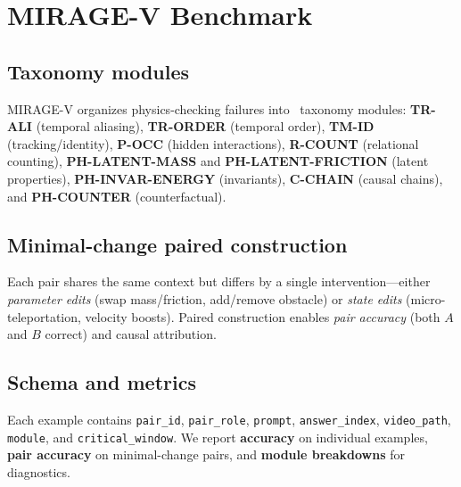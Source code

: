 \section{MIRAGE-V Benchmark}
\subsection{Taxonomy modules}
MIRAGE-V organizes physics-checking failures into \NumModules\ taxonomy modules: \textbf{TR-ALI} (temporal aliasing), \textbf{TR-ORDER} (temporal order), \textbf{TM-ID} (tracking/identity), \textbf{P-OCC} (hidden interactions), \textbf{R-COUNT} (relational counting), \textbf{PH-LATENT-MASS} and \textbf{PH-LATENT-FRICTION} (latent properties), \textbf{PH-INVAR-ENERGY} (invariants), \textbf{C-CHAIN} (causal chains), and \textbf{PH-COUNTER} (counterfactual).

\subsection{Minimal-change paired construction}
Each pair shares the same context but differs by a single intervention---either \emph{parameter edits} (swap mass/friction, add/remove obstacle) or \emph{state edits} (micro-teleportation, velocity boosts). Paired construction enables \emph{pair accuracy} (both $A$ and $B$ correct) and causal attribution.

\subsection{Schema and metrics}
Each example contains \texttt{pair\_id}, \texttt{pair\_role}, \texttt{prompt}, \texttt{answer\_index}, \texttt{video\_path}, \texttt{module}, and \texttt{critical\_window}. We report \textbf{accuracy} on individual examples, \textbf{pair accuracy} on minimal-change pairs, and \textbf{module breakdowns} for diagnostics.
